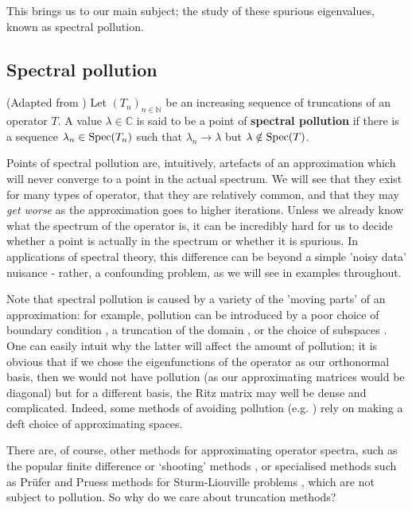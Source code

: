\documentclass[../main.tex]{subfiles}
\begin{document}
This brings us to our main subject; the study of these spurious eigenvalues, known as spectral pollution.

\subsection{Spectral pollution}

\begin{definition}
(Adapted from \parencite{davies1995spectral})
Let $(T_n)_{n \in \mathbb{N}}$ be an increasing sequence of truncations of an
operator $T$. A value $\lambda \in \mathbb{C}$ is said to be a point of
\textbf{spectral pollution} if there is a sequence $\lambda_n \in \mathrm{Spec}(T_n)$
such that $\lambda_n \rightarrow \lambda$ but $\lambda \notin \mathrm{Spec}(T)$.
\end{definition}

Points of spectral pollution are, intuitively, artefacts of an approximation
which will never converge to a point in the actual spectrum. We will see that
they exist for many types of operator, 
that they are relatively common, and that they may \emph{get worse} as
the approximation goes to higher iterations. Unless we already know what the
spectrum of the operator is, it can be incredibly hard for us to decide whether
a point is actually in the spectrum or whether it is
spurious. In applications of spectral theory, this difference can be beyond a
simple 'noisy data' nuisance - rather, a confounding problem, as we will see
in examples throughout.

Note that spectral pollution is caused by a variety of the 'moving parts' of
an approximation: for example, pollution can be introduced by a poor choice
of boundary condition \cite{cances2012periodic}, a truncation of the domain
\cite{aceto2006numerical}, or the choice of subspaces \cite{levitin2002spectral}.
One can easily intuit why the latter will affect the amount of pollution; it is
obvious that if we chose the eigenfunctions of the operator as our orthonormal basis,
then we would not have pollution (as our approximating matrices would be diagonal)
but for a different basis, the Ritz matrix may well be dense and complicated. Indeed,
some methods of avoiding pollution (e.g. \cite{boffi1999problem}) rely on making
a deft choice of approximating spaces.

There are, of course, other methods for approximating operator spectra, such as
the popular finite difference or `shooting' methods \cite{suli2003introduction},
or specialised methods such as Pr\"ufer and Pruess methods for Sturm-Liouville
problems \cite{pryce1993numerical}, which are not subject to pollution. So why
do we care about truncation methods?
\end{document}
